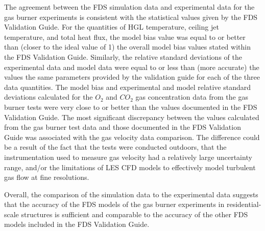 The agreement between the FDS simulation data and experimental data for the gas burner experiments is consistent with the statistical values given by the FDS Validation Guide. For the quantities of HGL temperature, ceiling jet temperature, and total heat flux, the model bias value was equal to or better than (closer to the ideal value of 1) the overall model bias values stated within the FDS Validation Guide. Similarly, the relative standard deviations of the experimental data and model data were equal to or less than (more accurate) the values the same parameters provided by the validation guide for each of the three data quantities. The model bias and experimental and model relative standard deviations calculated for the $O_2$ and $CO_2$ gas concentration data from the gas burner tests were very close to or better than the values documented in the FDS Validation Guide. The most significant discrepancy between the values calculated from the gas burner test data and those documented in the FDS Validation Guide was associated with the gas velocity data comparison. The difference could be a result of the fact that the tests were conducted outdoors, that the instrumentation used to measure gas velocity had a relatively large uncertainty range, and/or the limitations of LES CFD models to effectively model turbulent gas flow at fine resolutions.

Overall, the comparison of the simulation data to the experimental data suggests that the accuracy of the FDS models of the gas burner experiments in residential-scale structures is sufficient and comparable to the accuracy of the other FDS models included in the FDS Validation Guide.
